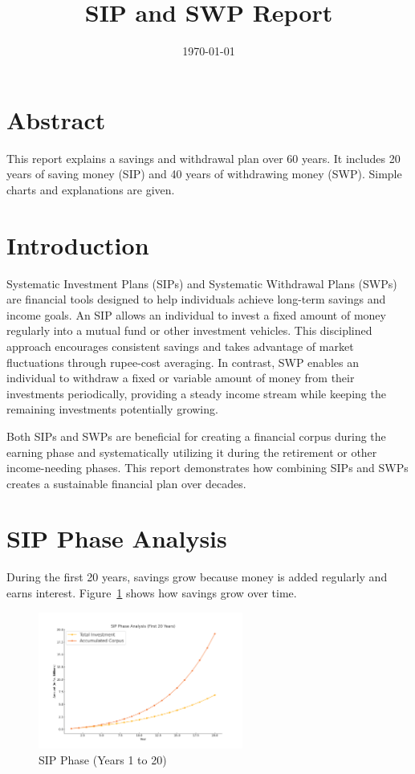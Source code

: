 \documentclass[a4paper,12pt]{article}
\begin{document}
		
		\title{SIP and SWP Report}
		\author{}
		\date{\today}
		\maketitle
		
		\section{Abstract}
		This report explains a savings and withdrawal plan over 60 years. It includes 20 years of saving money (SIP) and 40 years of withdrawing money (SWP). Simple charts and explanations are given.
		
		\section{Introduction}
		Systematic Investment Plans (SIPs) and Systematic Withdrawal Plans (SWPs) are financial tools designed to help individuals achieve long-term savings and income goals. An SIP allows an individual to invest a fixed amount of money regularly into a mutual fund or other investment vehicles. This disciplined approach encourages consistent savings and takes advantage of market fluctuations through rupee-cost averaging. In contrast, SWP enables an individual to withdraw a fixed or variable amount of money from their investments periodically, providing a steady income stream while keeping the remaining investments potentially growing. 
		
		Both SIPs and SWPs are beneficial for creating a financial corpus during the earning phase and systematically utilizing it during the retirement or other income-needing phases. This report demonstrates how combining SIPs and SWPs creates a sustainable financial plan over decades.
		
		\section{SIP Phase Analysis}
		During the first 20 years, savings grow because money is added regularly and earns interest. Figure~\ref{fig:sip-phase} shows how savings grow over time.
		

\begin{figure}[!h]
	\centering
	\includegraphics[width=0.6\textwidth]{sip_phase_plot.png}
	\caption{SIP Phase (Years 1 to 20)}
	\label{fig:sip-phase}
\end{figure}
\end{document}

